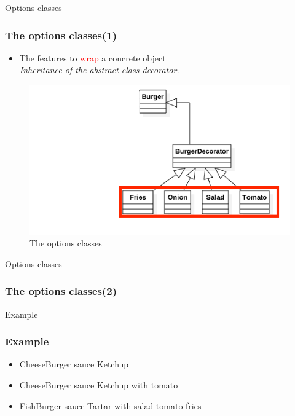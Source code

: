 \documentclass{beamer}
\begin{document}
  \begin{frame}{Options classes}
    \frametitle{The options classes(1)}
    \begin{itemize}
      \item The features to \textcolor{red}{wrap} a concrete object\\
      \textit{Inheritance of the abstract class decorator.}
    \end{itemize}
    \begin{figure}[!b]
      \centering
      \includegraphics[scale=0.4]{options}
      \caption{The options classes}
    \end{figure}
  \end{frame}

  \begin{frame}{Options classes}
    \frametitle{The options classes(2)}
    
  \end{frame}

  \begin{frame}{Example}
    \frametitle{Example}
    
    \begin{itemize}
      \item CheeseBurger sauce Ketchup
      \item CheeseBurger sauce Ketchup with tomato
      \item FishBurger sauce Tartar with salad tomato fries
    \end{itemize}
  \end{frame}
\end{document}
